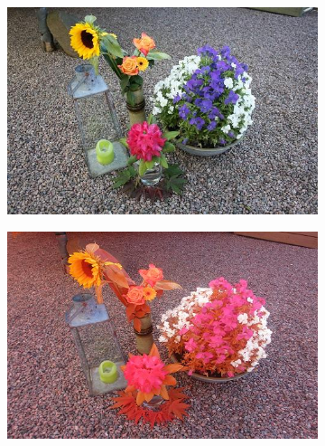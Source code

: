 \begin{figure}[H]
    \centering
    \captionsetup[subfigure]{justification=centering}
    \begin{subfigure}[b]{0.49\textwidth}
        \centering
        \includegraphics[width=\textwidth]{./figure/appendix/color_rep/images/imgRGB.jpg}
		\caption{}
		\label{fig:rgbVSnrgb1}
    \end{subfigure}
    \begin{subfigure}[b]{0.49\textwidth}
        \centering
        \includegraphics[width=\textwidth]{./figure/appendix/color_rep/images/nrgb.jpg}
		\caption{}
		\label{fig:rgbVSnrgb2}
    \end{subfigure}
    \begin{subfigure}[b]{0.49\textwidth}
        \centering

\end{subfigure}
\end{figure}
